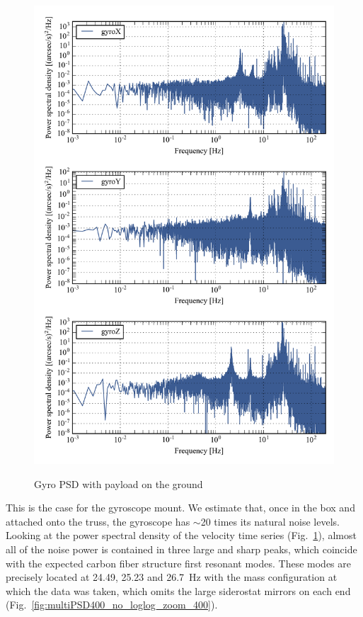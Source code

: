 \begin{figure}[!h]
\begin{center}
\includegraphics[width=\textwidth]{Figures/multiPSD400.png}
\label{fig:multiPSD400}
\vspace{-0.5cm}
\caption[Gyro PSD with payload on the ground]{Gyro PSD with payload on the ground}
\end{center}
\end{figure}


This is the case for the gyroscope mount. We estimate that, once in the box and attached onto the truss, the gyroscope has $\sim$20 times its natural noise levels. Looking at the power spectral density of the velocity time series (Fig.~\ref{fig:multiPSD400}), almost all of the noise power is contained in three large and sharp peaks, which coincide with the expected carbon fiber structure first resonant modes. These modes are precisely located at 24.49, 25.23 and \SI{26.7}{\hertz} with the mass configuration at which the data was taken, which omits the large siderostat mirrors on each end (Fig.~\ref{fig:multiPSD400_no_loglog_zoom_400}).

